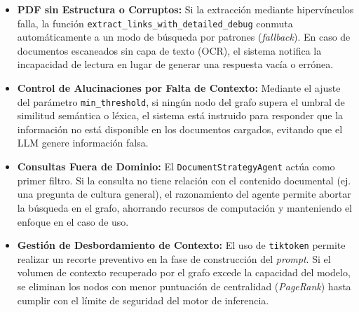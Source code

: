 \begin{itemize}
    \item \textbf{PDF sin Estructura o Corruptos:} Si la extracción mediante hipervínculos falla, la función \texttt{extract\_links\_with\_detailed\_debug} conmuta automáticamente a un modo de búsqueda por patrones (\textit{fallback}). En caso de documentos escaneados sin capa de texto (OCR), el sistema notifica la incapacidad de lectura en lugar de generar una respuesta vacía o errónea.
    \item \textbf{Control de Alucinaciones por Falta de Contexto:} Mediante el ajuste del parámetro \texttt{min\_thres\-hold}, si ningún nodo del grafo supera el umbral de similitud semántica o léxica, el sistema está instruido para responder que la información no está disponible en los documentos cargados, evitando que el LLM genere información falsa.
    \item \textbf{Consultas Fuera de Dominio:} El \texttt{DocumentStrategyAgent} actúa como primer filtro. Si la consulta no tiene relación con el contenido documental (ej. una pregunta de cultura general), el razonamiento del agente permite abortar la búsqueda en el grafo, ahorrando recursos de computación y manteniendo el enfoque en el caso de uso.
    \item \textbf{Gestión de Desbordamiento de Contexto:} El uso de \texttt{tiktoken} permite realizar un recorte preventivo en la fase de construcción del \textit{prompt}. Si el volumen de contexto recuperado por el grafo excede la capacidad del modelo, se eliminan los nodos con menor puntuación de centralidad (\textit{PageRank}) hasta cumplir con el límite de seguridad del motor de inferencia.
\end{itemize}
